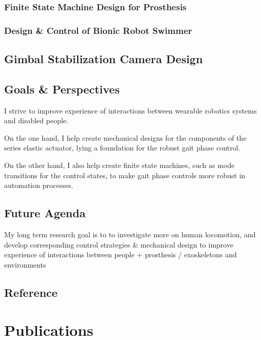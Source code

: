 \documentclass[12pt]{article}
\begin{document}
            \subsubsection{Finite State Machine Design for Prosthesis}

        \subsubsection{Design \& Control of Bionic Robot Swimmer} 


        \subsection{Gimbal Stabilization Camera Design}

    \subsection{Goals \& Perspectives}

        I strive to improve experience of interactions between wearable robotics systems and disabled people.

        On the one hand, I help create mechanical designs for the components of the series elastic actuator, lying a foundation for the robust gait phase control. 
            
        On the other hand, I also help create finite state machines, such as mode transitions for the control states, to make gait phase controls more robust in automation processes.

    \subsection{Future Agenda}

        My long term research goal is to to investigate more on human locomotion, and develop corresponding control strategies \& mechanical design to improve experience of interactions between people + prosthesis / exoskeletons and environments \cite{SpringDesign_OSL}

    \subsection{Reference}

\section{Publications}



\end{document}
